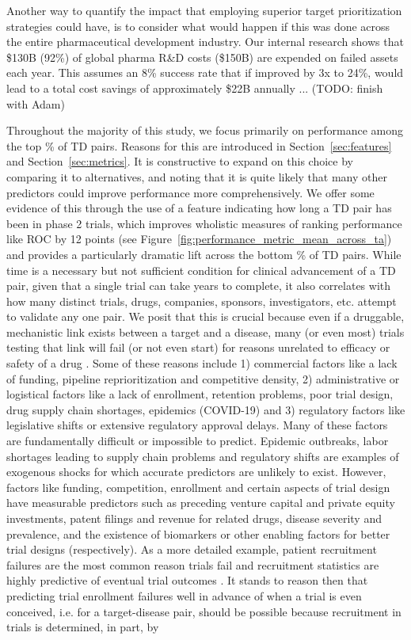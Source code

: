 \documentclass{article}
\begin{document}
Another way to quantify the impact that employing superior target prioritization strategies could have, is to consider what would happen if this was done across the entire pharmaceutical development industry. Our internal research shows that \$130B (92\%) of global pharma R\&D costs (\$150B) are expended on failed assets each year. This assumes an 8\% success rate that if improved by 3x to 24\%, would lead to a total cost savings of approximately \$22B annually ... (TODO: finish with Adam)

Throughout the majority of this study, we focus primarily on performance among the top \topRankingPct\% of TD pairs. Reasons for this are introduced in Section~\ref{sec:features} and Section~\ref{sec:metrics}. It is constructive to expand on this choice by comparing it to alternatives, and noting that it is quite likely that many other predictors could improve performance more comprehensively. We offer some evidence of this through the use of a feature indicating how long a TD pair has been in phase 2 trials, which improves wholistic measures of ranking performance like ROC by 12 points (see Figure~\ref{fig:performance_metric_mean_across_ta}) and provides a particularly dramatic lift across the bottom \bottomRankingPct\% of TD pairs. While time is a necessary but not sufficient condition for clinical advancement of a TD pair, given that a single trial can take years to complete, it also correlates with how many distinct trials, drugs, companies, sponsors, investigators, etc. attempt to validate any one pair. We posit that this is crucial because even if a druggable, mechanistic link exists between a target and a disease, many (or even most) trials testing that link will fail (or not even start) for reasons unrelated to efficacy or safety of a drug \cite{Razuvayevskaya2023.02.07.23285407}. Some of these reasons include 1) commercial factors like a lack of funding, pipeline reprioritization and competitive density, 2) administrative or logistical factors like a lack of enrollment, retention problems, poor trial design, drug supply chain shortages, epidemics (COVID-19) and 3) regulatory factors like legislative shifts or extensive regulatory approval delays. Many of these factors are fundamentally difficult or impossible to predict. Epidemic outbreaks, labor shortages leading to supply chain problems and regulatory shifts are examples of exogenous shocks for which accurate predictors are unlikely to exist. However, factors like funding, competition, enrollment and certain aspects of trial design have measurable predictors such as preceding venture capital and private equity investments, patent filings and revenue for related drugs, disease severity and prevalence, and the existence of biomarkers or other enabling factors for better trial designs (respectively). As a more detailed example, patient recruitment failures are the most common reason trials fail \cite{Razuvayevskaya2023.02.07.23285407} and recruitment statistics are highly predictive of eventual trial outcomes \cite{Lo2019Machine,PMID:34430930}. It stands to reason then that predicting trial enrollment failures well in advance of when a trial is even conceived, i.e. for a target-disease pair, should be possible because recruitment in trials is determined, in part, by 
\end{document}
